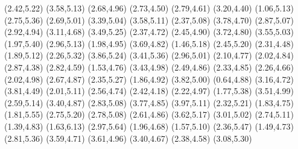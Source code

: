 \psdot[](2.42,5.22)
\psdot[](3.58,5.13)
\psdot[](2.68,4.96)
\psdot[](2.73,4.50)
\psdot[](2.79,4.61)
\psdot[](3.20,4.40)
\psdot[](1.06,5.13)
\psdot[](2.75,5.36)
\psdot[](2.69,5.01)
\psdot[](3.39,5.04)
\psdot[](3.58,5.11)
\psdot[](2.37,5.08)
\psdot[](3.78,4.70)
\psdot[](2.87,5.07)
\psdot[](2.92,4.94)
\psdot[](3.11,4.68)
\psdot[](3.49,5.25)
\psdot[](2.37,4.72)
\psdot[](2.45,4.90)
\psdot[](3.72,4.80)
\psdot[](3.55,5.03)
\psdot[](1.97,5.40)
\psdot[](2.96,5.13)
\psdot[](1.98,4.95)
\psdot[](3.69,4.82)
\psdot[](1.46,5.18)
\psdot[](2.45,5.20)
\psdot[](2.31,4.48)
\psdot[](1.89,5.12)
\psdot[](2.26,5.32)
\psdot[](3.86,5.24)
\psdot[](3.41,5.36)
\psdot[](2.96,5.01)
\psdot[](2.10,4.77)
\psdot[](2.02,4.84)
\psdot[](2.87,4.38)
\psdot[](2.82,4.59)
\psdot[](1.53,4.76)
\psdot[](3.43,4.98)
\psdot[](2.49,4.86)
\psdot[](2.33,4.85)
\psdot[](2.26,4.66)
\psdot[](2.02,4.98)
\psdot[](2.67,4.87)
\psdot[](2.35,5.27)
\psdot[](1.86,4.92)
\psdot[](3.82,5.00)
\psdot[](0.64,4.88)
\psdot[](3.16,4.72)
\psdot[](3.81,4.49)
\psdot[](2.01,5.11)
\psdot[](2.56,4.74)
\psdot[](2.42,4.18)
\psdot[](2.22,4.97)
\psdot[](1.77,5.38)
\psdot[](3.51,4.99)
\psdot[](2.59,5.14)
\psdot[](3.40,4.87)
\psdot[](2.83,5.08)
\psdot[](3.77,4.85)
\psdot[](3.97,5.11)
\psdot[](2.32,5.21)
\psdot[](1.83,4.75)
\psdot[](1.81,5.55)
\psdot[](2.75,5.20)
\psdot[](2.78,5.08)
\psdot[](2.61,4.86)
\psdot[](3.62,5.17)
\psdot[](3.01,5.02)
\psdot[](2.74,5.11)
\psdot[](1.39,4.83)
\psdot[](1.63,6.13)
\psdot[](2.97,5.64)
\psdot[](1.96,4.68)
\psdot[](1.57,5.10)
\psdot[](2.36,5.47)
\psdot[](1.49,4.73)
\psdot[](2.81,5.36)
\psdot[](3.59,4.71)
\psdot[](3.61,4.96)
\psdot[](3.40,4.67)
\psdot[](2.38,4.58)
\psdot[](3.08,5.30)
